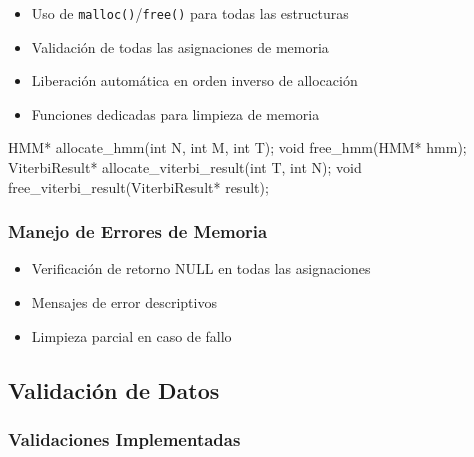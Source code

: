 \documentclass[
]{article}
\newenvironment{Shaded}{\begin{snugshade}}{\end{snugshade}}
\newcommand{\DataTypeTok}[1]{\textcolor[rgb]{0.68,0.00,0.00}{#1}}
\newcommand{\NormalTok}[1]{\textcolor[rgb]{0.00,0.23,0.31}{#1}}
\newcommand{\OperatorTok}[1]{\textcolor[rgb]{0.37,0.37,0.37}{#1}}
\providecommand{\tightlist}{%
  \setlength{\itemsep}{0pt}\setlength{\parskip}{0pt}}
\begin{document}
\begin{itemize}
\tightlist
\item
  Uso de \texttt{malloc()}/\texttt{free()} para todas las estructuras
\item
  Validación de todas las asignaciones de memoria
\item
  Liberación automática en orden inverso de allocación
\item
  Funciones dedicadas para limpieza de memoria
\end{itemize}

\begin{Shaded}
\begin{Highlighting}[]
\NormalTok{HMM}\OperatorTok{*}\NormalTok{ allocate\_hmm}\OperatorTok{(}\DataTypeTok{int}\NormalTok{ N}\OperatorTok{,} \DataTypeTok{int}\NormalTok{ M}\OperatorTok{,} \DataTypeTok{int}\NormalTok{ T}\OperatorTok{);}
\DataTypeTok{void}\NormalTok{ free\_hmm}\OperatorTok{(}\NormalTok{HMM}\OperatorTok{*}\NormalTok{ hmm}\OperatorTok{);}
\NormalTok{ViterbiResult}\OperatorTok{*}\NormalTok{ allocate\_viterbi\_result}\OperatorTok{(}\DataTypeTok{int}\NormalTok{ T}\OperatorTok{,} \DataTypeTok{int}\NormalTok{ N}\OperatorTok{);}
\DataTypeTok{void}\NormalTok{ free\_viterbi\_result}\OperatorTok{(}\NormalTok{ViterbiResult}\OperatorTok{*}\NormalTok{ result}\OperatorTok{);}
\end{Highlighting}
\end{Shaded}

\subsubsection{Manejo de Errores de
Memoria}\label{manejo-de-errores-de-memoria}

\begin{itemize}
\tightlist
\item
  Verificación de retorno NULL en todas las asignaciones
\item
  Mensajes de error descriptivos
\item
  Limpieza parcial en caso de fallo
\end{itemize}

\subsection{Validación de Datos}\label{validaciuxf3n-de-datos}

\subsubsection{Validaciones
Implementadas}\label{validaciones-implementadas}
\end{document}
